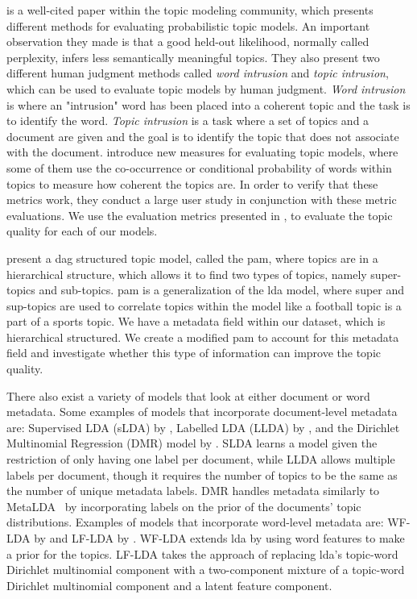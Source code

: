 \citet{tea_leaves} is a well-cited paper within the topic modeling community, which presents different methods for evaluating probabilistic topic models. 
An important observation they made is that a good held-out likelihood, normally called perplexity, infers less semantically meaningful topics.
They also present two different human judgment methods called \emph{word intrusion} and \emph{topic intrusion}, which can be used to evaluate topic models by human judgment. 
\emph{Word intrusion} is where an "intrusion" word has been placed into a coherent topic and the task is to identify the word.
\emph{Topic intrusion} is a task where a set of topics and a document are given and the goal is to identify the topic that does not associate with the document. 
\citet{topic_coherence_2015} introduce new measures for evaluating topic models, where some of them use the co-occurrence or conditional probability of words within topics to measure how coherent the topics are. 
In order to verify that these metrics work, they conduct a large user study in conjunction with these metric evaluations.
We use the evaluation metrics presented in \citet{topic_coherence_2015}, to evaluate the topic quality for each of our models.

\citet{li2006pachinko} present a \gls{dag} structured topic model, called the \gls{pam}, where topics are in a hierarchical structure, which allows it to find two types of topics, namely super-topics and sub-topics. 
\gls{pam} is a generalization of the \gls{lda} model, where super and sup-topics are used to correlate topics within the model like a football topic is a part of a sports topic.
We have a metadata field within our dataset, which is hierarchical structured.
We create a modified \gls{pam} to account for this metadata field and investigate whether this type of information can improve the topic quality.

There also exist a variety of models that look at either document or word metadata.
Some examples of models that incorporate document-level metadata are: Supervised LDA (sLDA) by \citet{blei2010supervised}, Labelled LDA (LLDA) by \citet{llda2009}, and the Dirichlet Multinomial Regression (DMR) model by \citet{mimno2008topic}.
SLDA learns a model given the restriction of only having one label per document, while LLDA allows multiple labels per document, though it requires the number of topics to be the same as the number of unique metadata labels.
DMR handles metadata similarly to MetaLDA~\cite{MetaLDA2017} by incorporating labels on the prior of the documents' topic distributions.
Examples of models that incorporate word-level metadata are: WF-LDA by \citet{wf-lda2010} and LF-LDA by \citet{lf-lda2015}.
WF-LDA extends \gls{lda} by using word features to make a prior for the topics.
LF-LDA takes the approach of replacing \gls{lda}'s topic-word Dirichlet multinomial component with a two-component mixture of a topic-word Dirichlet multinomial component and a latent feature component.

